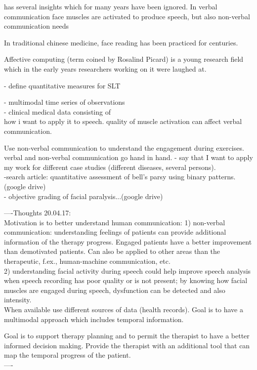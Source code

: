 has several insights which for many years have been ignored. In verbal communication face muscles are activated to produce speech, but also non-verbal communication needs 

In traditional chinese medicine, face reading has been practiced for centuries. 

Affective computing (term coined by Rosalind Picard) is a young research field which in the early years researchers working on it were laughed at.  


- define quantitative measures for SLT

- multimodal time series of observations\\
- clinical medical data consisting of \\

how i want to apply it to speech. quality of muscle activation can affect verbal communication. 

Use non-verbal communication to understand the engagement during exercises.\\

verbal and non-verbal communication go hand in hand.
- say that I want to apply my work for different case studies (different diseases, several persons).\\
-search article: quantitative assessment of bell's parsy using binary patterns. (google drive)\\
- objective grading of facial paralysis...(google drive)

----Thoughts 20.04.17:\\
Motivation is to better understand human communication: 1) non-verbal communication: understanding feelings of patients can provide additional information of the therapy progress. Engaged patients have a better improvement than demotivated patients. Can also be applied to other areas than the therapeutic, f.ex., human-machine communication, etc. \\
2) understanding facial activity during speech could help improve speech analysis when speech recording has poor quality or is not present; by knowing how facial muscles are engaged during speech, dysfunction can be detected and also intensity.\\
When available use different sources of data (health records). Goal is to have a multimodal approach which includes temporal information. 

Goal is to support therapy planning and to permit the therapist to have a better informed decision making. Provide the therapist with an additional tool that can map the temporal progress of the patient. \\ 
----\\

